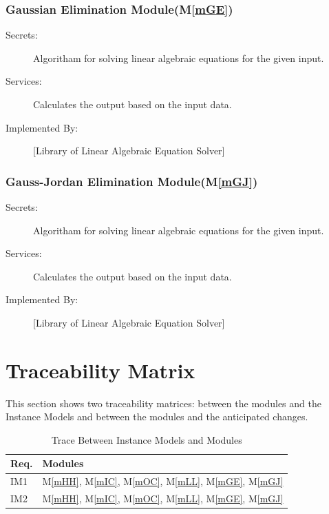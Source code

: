 \documentclass[12pt, titlepage]{article}
\newcommand{\mref}[1]{M\ref{#1}}
\begin{document}
\subsubsection{Gaussian Elimination Module(\mref{mGE})}

\begin{description}
\item[Secrets:]Algoritham for solving linear algebraic equations for the given input.
\item[Services:]Calculates the output based on the input data.
\item[Implemented By:] [Library of Linear Algebraic Equation Solver]
\end{description}

\subsubsection{Gauss-Jordan Elimination Module(\mref{mGJ})}

\begin{description}
\item[Secrets:]Algoritham for solving linear algebraic equations for the given input.
\item[Services:]Calculates the output based on the input data.
\item[Implemented By:] [Library of Linear Algebraic Equation Solver]
\end{description}




\section{Traceability Matrix} \label{SecTM}

This section shows two traceability matrices: between the modules and the
Instance Models and between the modules and the anticipated changes.

\begin{table}[H]
\centering
\begin{tabular}{p{} p{}}
\toprule
\textbf{Req.} & \textbf{Modules}\\
\midrule


IM1 & \mref{mHH}, \mref{mIC}, \mref{mOC}, \mref{mLL}, \mref{mGE}, \mref{mGJ}\\
IM2 & \mref{mHH}, \mref{mIC}, \mref{mOC}, \mref{mLL}, \mref{mGE}, \mref{mGJ}\\

\bottomrule
\end{tabular}
\caption{Trace Between Instance Models and Modules}
\label{TblRT}
\end{table}
\end{document}
